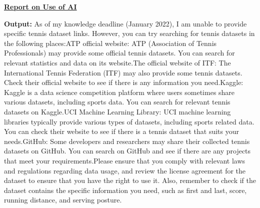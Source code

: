 \documentclass[12pt]{article}  %
\begin{document}
\begin{subappendices}
\begin{letter}{\centering \underline{\textbf{Report on Use of AI}}}
\begin{itemize}
		\subitem\textbf{Output: }As of my knowledge deadline (January 2022), I am unable to provide specific tennis dataset links. However, you can try searching for tennis datasets in the following places:ATP official website: ATP (Association of Tennis Professionals) may provide some official tennis datasets. You can search for relevant statistics and data on its website.The official website of ITF: The International Tennis Federation (ITF) may also provide some tennis datasets. Check their official website to see if there is any information you need.Kaggle: Kaggle is a data science competition platform where users sometimes share various datasets, including sports data. You can search for relevant tennis datasets on Kaggle.UCI Machine Learning Library: UCI machine learning libraries typically provide various types of datasets, including sports related data. You can check their website to see if there is a tennis dataset that suits your needs.GitHub: Some developers and researchers may share their collected tennis datasets on GitHub. You can search on GitHub and see if there are any projects that meet your requirements.Please ensure that you comply with relevant laws and regulations regarding data usage, and review the license agreement for the dataset to ensure that you have the right to use it. Also, remember to check if the dataset contains the specific information you need, such as first and last, score, running distance, and serving posture.
	\end{itemize}
\end{letter}





\end{subappendices}  %
\end{document}
